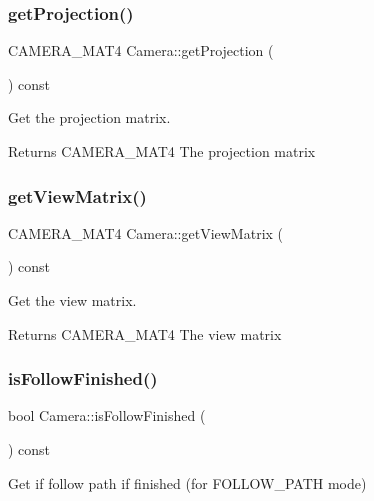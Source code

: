 \subsubsection{\texorpdfstring{get\+Projection()}{getProjection()}}
{\footnotesize\ttfamily C\+A\+M\+E\+R\+A\+\_\+\+M\+A\+T4 Camera\+::get\+Projection (\begin{DoxyParamCaption}{ }\end{DoxyParamCaption}) const}



Get the projection matrix. 

\begin{DoxyReturn}{Returns}
C\+A\+M\+E\+R\+A\+\_\+\+M\+A\+T4 The projection matrix 
\end{DoxyReturn}
\mbox{\label{class_camera_aa2e2289caff32f9ac552f1e5c6c7931f}} 
\subsubsection{\texorpdfstring{get\+View\+Matrix()}{getViewMatrix()}}
{\footnotesize\ttfamily C\+A\+M\+E\+R\+A\+\_\+\+M\+A\+T4 Camera\+::get\+View\+Matrix (\begin{DoxyParamCaption}{ }\end{DoxyParamCaption}) const}



Get the view matrix. 

\begin{DoxyReturn}{Returns}
C\+A\+M\+E\+R\+A\+\_\+\+M\+A\+T4 The view matrix 
\end{DoxyReturn}
\mbox{\label{class_camera_a3e7c256d5df9a0dd554b845e3ece414e}} 
\subsubsection{\texorpdfstring{is\+Follow\+Finished()}{isFollowFinished()}}
{\footnotesize\ttfamily bool Camera\+::is\+Follow\+Finished (\begin{DoxyParamCaption}{ }\end{DoxyParamCaption}) const}



Get if follow path if finished (for F\+O\+L\+L\+O\+W\+\_\+\+P\+A\+TH mode) 


